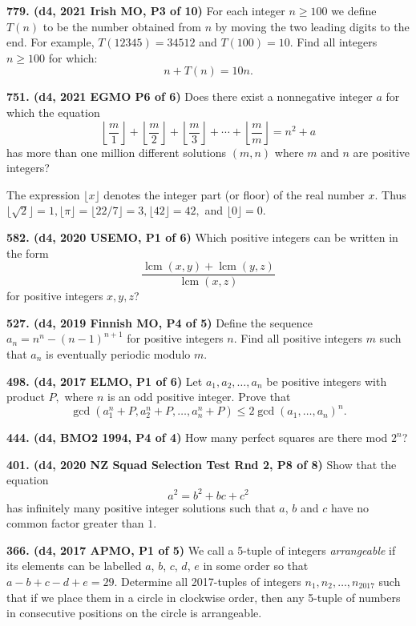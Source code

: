\documentclass{article}
\begin{document}
\textbf{779. (\color{red}d4\color{black}, 2021 Irish MO, P3 of 10)} For each integer $n \geq 100$ we define $T(n)$ to be the number obtained from $n$ by moving the two leading digits to the end. For example, $T(12345)=34512$ and $T(100)=10$. Find all integers $n \geq 100$ for which:
$$
    n+T(n)=10 n.
$$

\textbf{751. (\color{red}d4\color{black}, 2021 EGMO P6 of 6)} Does there exist a nonnegative integer $a$ for which the equation
\[\left\lfloor\frac{m}{1}\right\rfloor + \left\lfloor\frac{m}{2}\right\rfloor + \left\lfloor\frac{m}{3}\right\rfloor + \cdots + \left\lfloor\frac{m}{m}\right\rfloor = n^2 + a\]has more than one million different solutions $(m, n)$ where $m$ and $n$ are positive integers?

The expression $\lfloor x\rfloor$ denotes the integer part (or floor) of the real number $x$. Thus $\lfloor\sqrt{2}\rfloor = 1, \lfloor\pi\rfloor =\lfloor 22/7 \rfloor = 3, \lfloor 42\rfloor = 42,$ and $\lfloor 0 \rfloor = 0$.

\textbf{582. (\color{red}d4\color{black}, 2020 USEMO, P1 of 6)} Which positive integers can be written in the form
$$
    \frac{\operatorname{lcm}(x, y)+\operatorname{lcm}(y, z)}{\operatorname{lcm}(x, z)}
$$
for positive integers $x, y, z$?

\textbf{527. (\color{red}d4\color{black}, 2019 Finnish MO, P4 of 5)} Define the sequence $a_n = n^n - (n-1)^{n+1}$ for positive integers $n$. Find all positive integers $m$ such that $a_n$ is eventually periodic modulo $m$.

\textbf{498. (\color{red}d4\color{black}, 2017 ELMO, P1 of 6)} Let $a_1,a_2,\dots, a_n$ be positive integers with product $P,$ where $n$ is an odd positive integer. Prove that$$\gcd(a_1^n+P,a_2^n+P,\dots, a_n^n+P)\le 2\gcd(a_1,\dots, a_n)^n.$$

\textbf{444. (\color{red}d4\color{black}, BMO2 1994, P4 of 4)} How many perfect squares are there mod $2^n$?

\textbf{401. (\color{red}d4\color{black}, 2020 NZ Squad Selection Test Rnd 2, P8 of 8)} Show that the equation $$a^2 = b^2 + bc + c^2$$ has infinitely many positive integer solutions such that $a$, $b$ and $c$ have no common factor greater than $1$.

\textbf{366. (\color{red}d4\color{black}, 2017 APMO, P1 of 5)} We call a 5-tuple of integers \textit{arrangeable} if its elements can be labelled $a$, $b$, $c$, $d$, $e$ in some order so that $a - b + c - d + e = 29$. Determine all 2017-tuples of integers $n_1, n_2, \dots, n_{2017}$ such that if we place them in a circle in clockwise order, then any 5-tuple of numbers in consecutive positions on the circle is arrangeable.
\end{document}
